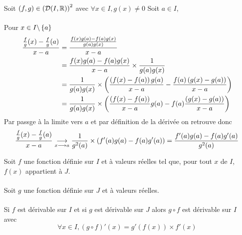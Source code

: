 \begin{dem}[Preuve dérivée \(\paren{\frac{f}{g}}' = \frac{f'g - fg'}{g^2}\)]
    Soit \(\left(f,g\right) \in\left(\mathcal{D}(I,\mathbb{R})\right)^2 \) avec \(\forall x \in I,g(x) \neq 0\)
    Soit  \(a \in I\), \\~\\
    Pour \(x \in I \backslash \left\lbrace a\right\rbrace\)
    \begin{align*}
        \frac{\frac{f}{g}(x) - \frac{f}{g}(a)}{x-a} &= \frac{\frac{f(x)g(a) - f(a)g(x)}{g(a)g(x)}}{x-a} \\
        &= \frac{f(x)g(a) - f(a)g(x)}{x-a}\times \frac{1}{g(a)g(x)} \\
        &= \frac{1}{g(a)g(x)} \times \left(\frac{\left(f(x) - f(a)\right)g(a)}{x-a} - \frac{f(a)\left(g(x)-g(a)\right)}{x-a}\right)\\
        &= \frac{1}{g(a)g(x)} \times \left(\frac{\left(f(x) - f(a)\right)}{x-a}g(a) - f(a)\frac{\left(g(x)-g(a)\right)}{x-a}\right)
    \end{align*}
    Par passge à la limite vers \(a\) et par définition de la dérivée on retrouve donc 
    \[\frac{\frac{f}{g}(x) - \frac{f}{g}(a)}{x-a} \underset{x \longrightarrow a}{\longrightarrow} \frac{1}{g^2(a)} \times \left(f'(a)g(a) - f(a)g'(a)\right) = \frac{ f'(a)g(a) - f(a)g'(a)}{g^2(a)}\]
\end{dem}

\begin{defprop}
    Soit \(f\) une fonction définie sur \(I\) et à valeurs réelles tel que, pour tout \(x\) de \(I\),\( f (x)\) appartient à \(J\).\\~\\
    Soit \(g\) une fonction définie sur \(J\) et à valeurs réelles.\\~\\
    Si \(f\) est dérivable sur \(I\) et si \(g\) est dérivable sur \(J\) alors \(g \circ f\) est dérivable sur \(I\) avec 
    \[\forall x \in I, (g \circ f )'(x) = g' (f (x)) \times f '(x)\]
\end{defprop}

